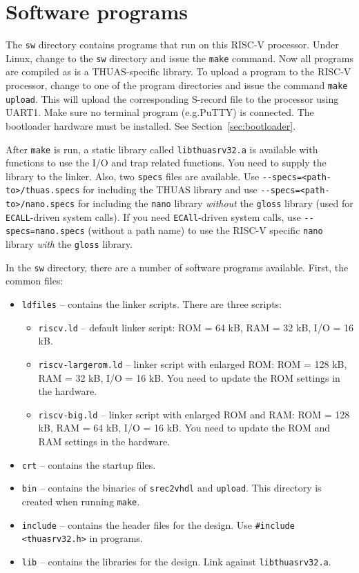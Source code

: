 \documentclass[12pt]{article}
\begin{document}

\section{Software programs}
The \lstinline|sw| directory contains programs that run on this RISC-V processor. Under Linux, change to the \lstinline|sw| directory and issue the \lstinline|make| command. Now all programs are compiled as is a THUAS-specific library. To upload a program to the RISC-V processor, change to one of the program directories and issue the command \lstinline|make upload|. This will upload the corresponding S-record file to the processor using UART1. Make sure no terminal program (e.g.\@ PuTTY) is connected. The bootloader hardware must be installed. See Section~\ref{sec:bootloader}.

After \lstinline|make| is run, a static library called \lstinline|libthuasrv32.a| is available with functions to use the I/O and trap related functions. You need to supply the library to the linker. Also, two \lstinline|specs| files are available. Use \lstinline|--specs=<path-to>/thuas.specs| for including the THUAS library and use \lstinline|--specs=<path-to>/nano.specs| for including the \lstinline|nano| library \textsl{without} the \lstinline|gloss| library (used for \lstinline|ECALL|-driven system calls). If you need \lstinline|ECAll|-driven system calls, use \lstinline|--specs=nano.specs| (without a path name) to use the RISC-V specific \lstinline|nano| library \textsl{with} the \lstinline|gloss| library.

In the \lstinline|sw| directory, there are a number of software programs available. First, the common files:

\begin{itemize}
\item \lstinline|ldfiles| -- contains the linker scripts. There are three scripts:
\begin{itemize}
\item \lstinline|riscv.ld| -- default linker script: ROM = 64 kB, RAM = 32 kB, I/O = 16 kB.
\item \lstinline|riscv-largerom.ld| -- linker script with enlarged ROM: ROM = 128 kB, RAM = 32 kB, I/O = 16 kB. You need to update the ROM settings in the hardware.
\item \lstinline|riscv-big.ld| -- linker script with enlarged ROM and RAM: ROM = 128 kB, RAM = 64 kB, I/O = 16 kB. You need to update the ROM and RAM settings in the hardware.
\end{itemize}
\item \lstinline|crt| -- contains the startup files.
\item \lstinline|bin| -- contains the binaries of \lstinline|srec2vhdl| and \lstinline|upload|. This directory is created when running \lstinline|make|.
\item \lstinline|include| -- contains the header files for the design. Use \lstinline|#include <thuasrv32.h>| in programs.
\item \lstinline|lib| -- contains the libraries for the design. Link against \lstinline|libthuasrv32.a|.
\end{itemize}
\end{document}
